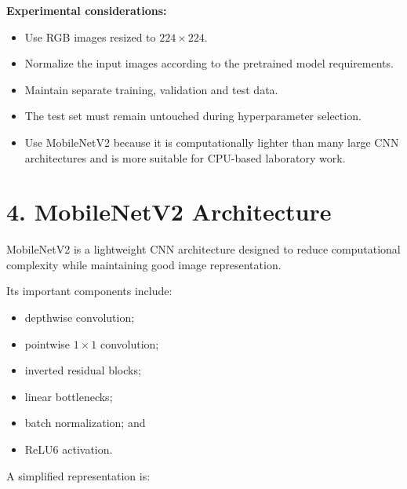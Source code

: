 \documentclass[10pt]{article}
\begin{document}
\textbf{Experimental considerations:}

\begin{itemize}
\item Use RGB images resized to $224\times224$.
\item Normalize the input images according to the pretrained model requirements.
\item Maintain separate training, validation and test data.
\item The test set must remain untouched during hyperparameter selection.
\item Use MobileNetV2 because it is computationally lighter than many
large CNN architectures and is more suitable for CPU-based laboratory work.
\end{itemize}

\section*{4. MobileNetV2 Architecture}

MobileNetV2 is a lightweight CNN architecture designed to reduce
computational complexity while maintaining good image representation.

Its important components include:

\begin{itemize}
\item depthwise convolution;
\item pointwise $1\times1$ convolution;
\item inverted residual blocks;
\item linear bottlenecks;
\item batch normalization; and
\item ReLU6 activation.
\end{itemize}

A simplified representation is:

\begin{center}
\end{center}
\end{document}
